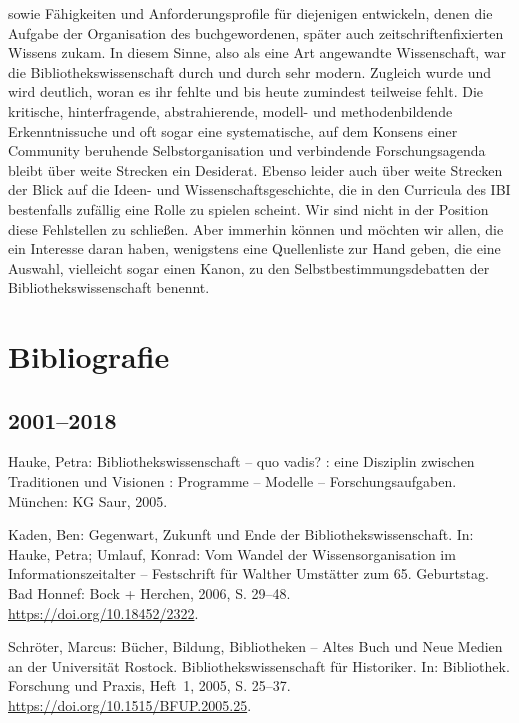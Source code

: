 \documentclass[a4paper,
fontsize=11pt,
oneside,
numbers=noperiodatend,
parskip=half-,
bibliography=totoc,
final
]{scrartcl}
\begin{document}
sowie Fähigkeiten und Anforderungsprofile für diejenigen entwickeln,
denen die Aufgabe der Organisation des buchgewordenen, später auch
zeitschriftenfixierten Wissens zukam. In diesem Sinne, also als eine Art
angewandte Wissenschaft, war die Bibliothekswissenschaft durch und durch
sehr modern. Zugleich wurde und wird deutlich, woran es ihr fehlte und
bis heute zumindest teilweise fehlt. Die kritische, hinterfragende,
abstrahierende, modell- und methodenbildende Erkenntnissuche und oft
sogar eine systematische, auf dem Konsens einer Community beruhende
Selbstorganisation und verbindende Forschungsagenda bleibt über weite
Strecken ein Desiderat. Ebenso leider auch über weite Strecken der Blick
auf die Ideen- und Wissenschaftsgeschichte, die in den Curricula des IBI
bestenfalls zufällig eine Rolle zu spielen scheint. Wir sind nicht in
der Position diese Fehlstellen zu schließen. Aber immerhin können und
möchten wir allen, die ein Interesse daran haben, wenigstens eine
Quellenliste zur Hand geben, die eine Auswahl, vielleicht sogar einen
Kanon, zu den Selbstbestimmungsdebatten der Bibliothekswissenschaft
benennt.

\hypertarget{bibliografie}{%
\section{Bibliografie}\label{bibliografie}}

\hypertarget{section}{%
\subsection*{2001--2018}\label{section}}

Hauke, Petra: Bibliothekswissenschaft -- quo vadis? : eine Disziplin
zwischen Traditionen und Visionen : Programme -- Modelle --
Forschungsaufgaben. München: KG Saur, 2005.

Kaden, Ben: Gegenwart, Zukunft und Ende der Bibliothekswissenschaft. In:
Hauke, Petra; Umlauf, Konrad: Vom Wandel der Wissensorganisation im
Informationszeitalter -- Festschrift für Walther Umstätter zum 65.
Geburtstag. Bad Honnef: Bock + Herchen, 2006, S. 29--48.\\
\href{https://doi.org/10.18452/2322}{https://doi.org/10.18452/2322}.

Schröter, Marcus: Bücher, Bildung, Bibliotheken -- Altes Buch und Neue
Medien an der Universität Rostock. Bibliothekswissenschaft für
Historiker. In: Bibliothek. Forschung und Praxis, Heft~1, 2005, S. 25--37.
\url{https://doi.org/10.1515/BFUP.2005.25}.
\end{document}
